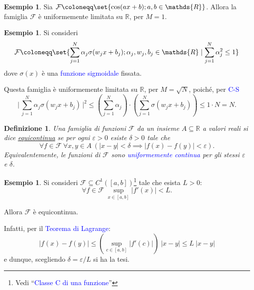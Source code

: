 \documentclass[10pt]{book}
\newcommand{\1}{\mathds{1}}
\newcommand{\R}{\mathds{R}}
\theoremstyle{definition}%
\newtheorem{esempio}[thm]{Esempio}
\theoremstyle{plain}
\newtheorem{definizione}[thm]{Definizione}
\theoremstyle{remark}
\renewcommand{\href}[2]{\textcolor{blue}{#2}}
\begin{document}
\begin{esempio}
Sia \(\mathcal{F} \coloneqq \set{\cos(ax+b); a,b \in \R}\). Allora la famiglia \(\mathcal{F}\) è uniformemente limitata su \(\R\), per \(M=1\).
\end{esempio}

\begin{esempio}
Si consideri
\begin{equation*}
\mathcal{F}\coloneqq \set{\sum_{j=1}^{N} \alpha_{j}\sigma(w_{j}x+b_{j}); \alpha_{j}, w_{j}, b_{j} \in \R\mid \sum_{j=1}^{N}\alpha_{j}^{2} \le 1}
\end{equation*}
dove \(\sigma(x)\) è una \href{../../../../../org/roam/20250625110110-funzione_sigmoidale.org}{funzione sigmoidale} fissata.

Questa famiglia è uniformemente limitata su \(\R\), per \(M=\sqrt{N}\), poiché, per \href{../../../../../org/roam/20250629112810-disuguaglianza_di_cauchy_schwarz.org}{C-S}
\begin{equation*}
\bigg\lvert\,\sum_{j=1}^{N}\alpha_{j}\sigma(w_{j}x+b_{j})\,\bigg\rvert^{2}\le \left(\sum_{j=1}^{N}\alpha_{j}\right)\cdot\left(\sum_{j=1}^{N}\sigma(w_{j}x+b_{j})\right)\le 1\cdot N=N.
\end{equation*}
\end{esempio}
\begin{definizione}
Una famiglia di funzioni \(\mathcal{F}\) da un insieme \(A \subseteq \R\) a valori reali si dice \uline{equicontinua} se per ogni \(\varepsilon>0\) esiste \(\delta>0\) tale che
\begin{equation*}
\forall f \in \mathcal{F}\ \forall x,y \in A\ \left(|x-y|<\delta\implies |f(x)-f(y)|<\varepsilon\right).
\end{equation*}
Equivalentemente, le funzioni di \(\mathcal{F}\) sono \href{../../../../../org/roam/20250611135127-funzione_uniformemente_continua.org}{uniformemente continua} per gli stessi \(\varepsilon\) e \(\delta\).
\end{definizione}

\begin{esempio}
Si consideri \(\mathcal{F} \subseteq C^{1}\left([a,b]\right)\)\footnote{Vedi ``\href{../../../../../org/roam/20250113125602-classe_c_di_una_funzione.org}{Classe C di una funzione}''} tale che esista \(L>0\):
\begin{equation*}
\forall f \in \mathcal{F}\ \sup_{x \in [a,b]}|f'(x)|<L.
\end{equation*}

Allora \(\mathcal{F}\) è equicontinua.

Infatti, per il \href{../../../../../org/roam/20250629143200-teorema_di_lagrange.org}{Teorema di Lagrange}:
\begin{equation*}
|f(x)-f(y)|\le \left(\sup_{c \in [a,b]} |f'(c)|\right)\ |x-y| \le L\ |x-y|
\end{equation*}
e dunque, scegliendo \(\delta = \varepsilon/L\) si ha la tesi.
\end{esempio}
\end{document}
